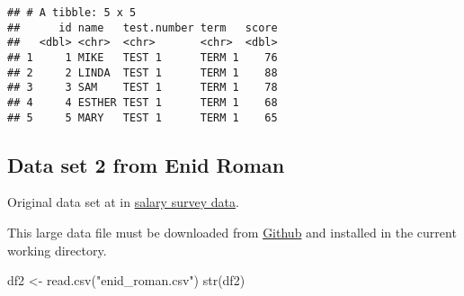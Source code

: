 \documentclass[
]{article}
\newenvironment{Shaded}{\begin{snugshade}}{\end{snugshade}}
\newcommand{\FunctionTok}[1]{\textcolor[rgb]{0.00,0.00,0.00}{#1}}
\newcommand{\NormalTok}[1]{#1}
\newcommand{\OtherTok}[1]{\textcolor[rgb]{0.56,0.35,0.01}{#1}}
\newcommand{\StringTok}[1]{\textcolor[rgb]{0.31,0.60,0.02}{#1}}
\begin{document}
\begin{verbatim}
## # A tibble: 5 x 5
##      id name   test.number term   score
##   <dbl> <chr>  <chr>       <chr>  <dbl>
## 1     1 MIKE   TEST 1      TERM 1    76
## 2     2 LINDA  TEST 1      TERM 1    88
## 3     3 SAM    TEST 1      TERM 1    78
## 4     4 ESTHER TEST 1      TERM 1    68
## 5     5 MARY   TEST 1      TERM 1    65
\end{verbatim}

\hypertarget{data-set-2-from-enid-roman}{%
\subsection{Data set 2 from Enid
Roman}\label{data-set-2-from-enid-roman}}

Original data set at in
\href{https://docs.google.com/spreadsheets/d/1IPS5dBSGtwYVbjsfbaMCYIWnOuRmJcbequohNxCyGVw/edit?resourcekey\#gid=1625408792}{salary
survey data}.

This large data file must be downloaded from
\href{https://github.com/himalayahall/DATA607/blob/main/Project2/enid_roman.csv}{Github}
and installed in the current working directory.

\begin{Shaded}
\begin{Highlighting}[]
\NormalTok{df2 }\OtherTok{\textless{}{-}} \FunctionTok{read.csv}\NormalTok{(}\StringTok{"enid\_roman.csv"}\NormalTok{)}
\FunctionTok{str}\NormalTok{(df2)}
\end{Highlighting}
\end{Shaded}
\end{document}
